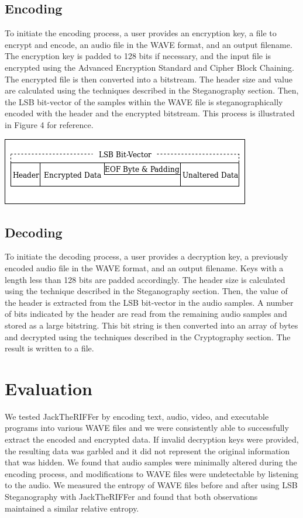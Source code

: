 \subsection{Encoding}
To initiate the encoding process, a user provides an encryption key, a file to encrypt and encode, an audio file in the WAVE format, and an output filename. The encryption key is padded to 128 bits if necessary, and the input file is encrypted using the Advanced Encryption Standard and Cipher Block Chaining. The encrypted file is then converted into a bitstream. The header size and value are calculated using the techniques described in the Steganography section. Then, the LSB bit-vector of the samples within the WAVE file is steganographically encoded with the header and the encrypted bitstream. This process is illustrated in Figure 4 for reference.            
\vspace{4 mm}

\noindent
\includegraphics[width=\columnwidth]{images/LSBBitVectorSmall.png}



\subsection{Decoding}
To initiate the decoding process, a user provides a decryption key, a previously encoded audio file in the WAVE format, and an output filename. Keys with a length less than 128 bits are padded accordingly. The header size is calculated using the technique described in the Steganography section. Then, the value of the header is extracted from the LSB bit-vector in the audio samples. A number of bits indicated by the header are read from the remaining audio samples and stored as a large bitstring. This bit string is then converted into an array of bytes and decrypted using the techniques described in the Cryptography section. The result is written to a file.

\section{Evaluation}
We tested JackTheRIFFer by encoding text, audio, video, and executable programs into various WAVE files and we were consistently able to successfully extract the encoded and encrypted data. If invalid decryption keys were provided, the resulting data was garbled and it did not represent the original information that was hidden. We found that audio samples were minimally altered during the encoding process, and modifications to WAVE files were undetectable by listening to the audio. We measured the entropy of WAVE files before and after using LSB Steganography with JackTheRIFFer and found that both observations maintained a similar relative entropy.

